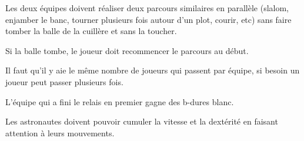 \documentclass{grand-jeu}
\begin{document}
\begin{liste-materiel}
\end{liste-materiel}


\begin{regles}
Les deux équipes doivent réaliser deux parcours similaires en parallèle (slalom, enjamber le banc, tourner plusieurs fois autour d'un plot, courir, etc) sans faire tomber la balle de la cuillère et sans la toucher. 

Si la balle tombe, le joueur doit recommencer le parcours au début.

Il faut qu'il y aie le même nombre de joueurs qui passent par équipe, si besoin un joueur peut passer plusieurs fois.

L'équipe qui a fini le relais en premier gagne des b-dures blanc. 
\end{regles}

\begin{imaginaire}
Les astronautes doivent pouvoir cumuler la vitesse et la dextérité en faisant attention à leurs mouvements.
\end{imaginaire}

\begin{moments-stop}
\end{moments-stop}
\end{document}
